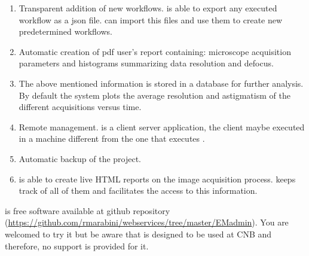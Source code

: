 \begin{enumerate}
 \item Transparent addition of new workflows. \scipion is able to export any executed workflow as a json file. \emadmin can import this files and use them to create new predetermined workflows.
 \item Automatic creation of pdf user's report containing: microscope acquisition parameters and histograms summarizing data resolution and  defocus. 
 \item The above mentioned information is stored in a database for further analysis. By default the system plots the  average resolution and astigmatism of the different acquisitions versus time.
 \item Remote management. \emadmin is a client server application, the client maybe executed in a machine different from the one that executes \scipion.
 \item Automatic backup of the \scipion project.
 \item \scipion is able to create live HTML reports on the image acquisition process. \emadmin keeps track of all of them and facilitates the access to this information.
\end{enumerate}

\emadmin is free software available at github repository (\url{https://github.com/rmarabini/webservices/tree/master/EMadmin}). You are welcomed to try it but be aware that \emadmin is designed to be used at CNB and therefore, no support is provided for it.


